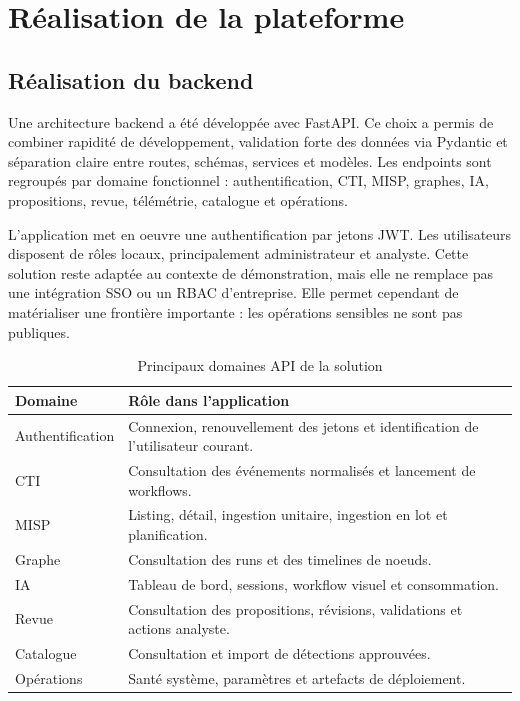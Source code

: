 \chapter{Réalisation de la plateforme}

\section{Réalisation du backend}

Une architecture backend a été développée avec FastAPI. Ce choix a permis de combiner rapidité de développement, validation forte des données via Pydantic et séparation claire entre routes, schémas, services et modèles. Les endpoints sont regroupés par domaine fonctionnel : authentification, CTI, MISP, graphes, IA, propositions, revue, télémétrie, catalogue et opérations.

L'application met en oeuvre une authentification par jetons JWT. Les utilisateurs disposent de rôles locaux, principalement administrateur et analyste. Cette solution reste adaptée au contexte de démonstration, mais elle ne remplace pas une intégration SSO ou un RBAC d'entreprise. Elle permet cependant de matérialiser une frontière importante : les opérations sensibles ne sont pas publiques.

\begin{longtable}{p{4cm}p{10cm}}
\caption{Principaux domaines API de la solution}
\label{tab:api-domaines}\\
\toprule
\textbf{Domaine} & \textbf{Rôle dans l'application}\\
\midrule
Authentification & Connexion, renouvellement des jetons et identification de l'utilisateur courant.\\
CTI & Consultation des événements normalisés et lancement de workflows.\\
MISP & Listing, détail, ingestion unitaire, ingestion en lot et planification.\\
Graphe & Consultation des runs et des timelines de noeuds.\\
IA & Tableau de bord, sessions, workflow visuel et consommation.\\
Revue & Consultation des propositions, révisions, validations et actions analyste.\\
Catalogue & Consultation et import de détections approuvées.\\
Opérations & Santé système, paramètres et artefacts de déploiement.\\
\bottomrule
\end{longtable}

